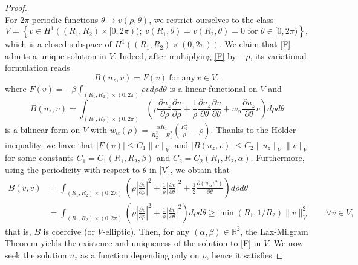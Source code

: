 \documentclass[10pt,a4paper]{amsart}
\begin{document}
\begin{proof}
\begin{equation}
		\end{equation}
		For $2\pi$-periodic functions $\theta\mapsto v(\rho, \theta)$, we restrict ourselves to the class
		\begin{equation}\label{V}
			V=\left\{v\in H^1((R_1,R_2)\times [0,2\pi));\ v(R_1,\theta)=v(R_2, \theta)=0  \text{ for $\theta\in[0,2\pi)$}\right\},
		\end{equation}which is a closed subspace of $H^1((R_1,R_2)\times (0,2\pi))$. 	We claim that \eqref{F} admits a unique solution in $V$.
		Indeed, after multiplying \eqref{F} by $-\rho$, its variational formulation reads
		\begin{equation}\label{var-form}
			B(u_z, v)= F(v) \ \text{for any} \ v\in V,
		\end{equation}
		where $F(v)=-\beta\int_{(R_1,R_2)\times (0,2\pi)} \rho vd\rho d\theta$ is a linear functional on $V$ and \begin{equation}\label{B}B(u_z, v)=\int_{(R_1,R_2)\times (0,2\pi)} \left(\rho \frac{\partial u_z}{\partial \rho}\frac{\partial v}{\partial \rho} + \frac{1}{\rho}\frac{\partial u_z}{\partial \theta} \frac{\partial v}{\partial \theta} + w_\alpha \frac{\partial u_z}{\partial \theta}v\right) d\rho d\theta\end{equation} is a bilinear form on $V$ with $w_\alpha(\rho)= \frac{\alpha R_1}{R_2^2-R_1^2}\left( \frac{R_2^2}{\rho} -\rho\right)$. Thanks to the Hölder inequality, we have that $|F(v)|\leq C_1\|v\|_V$ and $|B(u_z, v)|\leq C_2 \|u_z\|_{V}\|v\|_{V}$ for some constants $C_1=C_1(R_1,R_2,\beta)$ and $C_2=C_2(R_1,R_2, \alpha)$. Furthermore, using the periodicity with respect to $\theta$ in \eqref{V}, we obtain that
		\begin{equation*}\begin{aligned}
				B(v, v)&= \int_{(R_1,R_2)\times (0,2\pi)} \left( \rho\left|\frac{\partial v}{\partial \rho}\right|^2 + \frac{1}{\rho}\left|\frac{\partial v}{\partial \theta}\right|^2 +\frac{1 }{2}\frac{\partial (w_\alpha v^2)}{\partial \theta} \right) d\rho d\theta\\
				&= \int_{(R_1,R_2)\times (0,2\pi)} \left( \rho \left|\frac{\partial v}{\partial \rho}\right|^2 + \frac{1}{\rho}\left|\frac{\partial v}{\partial \theta}\right|^2  \right) d\rho d\theta\geq \min (R_1, 1/R_2)\|v\|^2_V\qquad\forall v\in V,
			\end{aligned}
		\end{equation*} that is, $B$ is coercive (or $V$-elliptic). Then, for any $(\alpha, \beta)\in \mathbb{R}^2$, the Lax-Milgram Theorem yields the existence and uniqueness of the solution to \eqref{F} in $V$. We now seek the solution $u_z$ as a function depending only on $\rho$, hence it satisfies

\end{proof}
\end{document}

